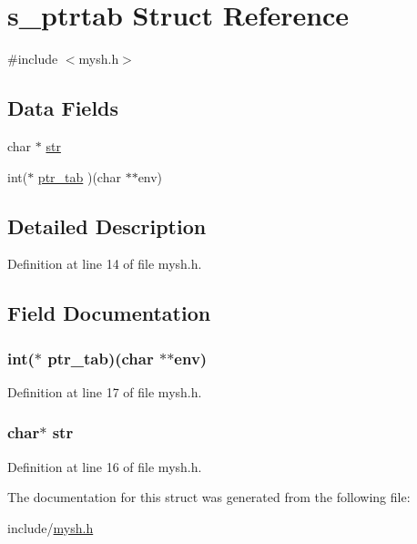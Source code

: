 \hypertarget{structs__ptrtab}{\section{s\+\_\+ptrtab Struct Reference}
\label{structs__ptrtab}
}


{\ttfamily \#include $<$mysh.\+h$>$}

\subsection*{Data Fields}
\begin{DoxyCompactItemize}
\item 
char $\ast$ \hyperlink{structs__ptrtab_ab50d783982593ef993ea0b68f7ad8b80}{str}
\item 
int($\ast$ \hyperlink{structs__ptrtab_a0e6c6151befb0a867454caed04ab6729}{ptr\+\_\+tab} )(char $\ast$$\ast$env)
\end{DoxyCompactItemize}


\subsection{Detailed Description}


Definition at line 14 of file mysh.\+h.



\subsection{Field Documentation}
\hypertarget{structs__ptrtab_a0e6c6151befb0a867454caed04ab6729}{
\subsubsection[{ptr\+\_\+tab}]{\setlength{\rightskip}{0pt plus 5cm}int($\ast$ ptr\+\_\+tab)(char $\ast$$\ast$env)}}\label{structs__ptrtab_a0e6c6151befb0a867454caed04ab6729}


Definition at line 17 of file mysh.\+h.

\hypertarget{structs__ptrtab_ab50d783982593ef993ea0b68f7ad8b80}{
\subsubsection[{str}]{\setlength{\rightskip}{0pt plus 5cm}char$\ast$ str}}\label{structs__ptrtab_ab50d783982593ef993ea0b68f7ad8b80}


Definition at line 16 of file mysh.\+h.



The documentation for this struct was generated from the following file\+:\begin{DoxyCompactItemize}
\item 
include/\hyperlink{mysh_8h}{mysh.\+h}\end{DoxyCompactItemize}
